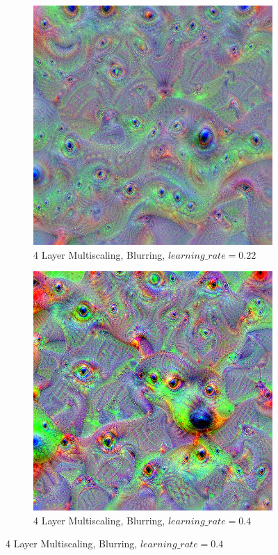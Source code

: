 \begin{figure}
\begin{subfigure}[t]{0.31\textwidth}
    \end{subfigure}
    \hfill
    \begin{subfigure}[t]{0.31\textwidth}
        \captionsetup{justification=centering}
        \centering
        \includegraphics[width=.7\linewidth]{figuras/feat_vis/experiments/final/l12/random_image_pl4_lr2.2e-1_layer26.png}
        \caption{4 Layer Multiscaling, Blurring, \(learning\_rate = 0.22\)}
    \end{subfigure}
    \hfill
    \begin{subfigure}[t]{0.31\textwidth}
        \captionsetup{justification=centering}
        \centering
        \includegraphics[width=.7\linewidth]{figuras/feat_vis/experiments/final/l12/random_image_pl4_lr4e-1_layer26.png}
        \caption{4 Layer Multiscaling, Blurring, \(learning\_rate = 0.4\)}
    \end{subfigure}

\end{figure}
